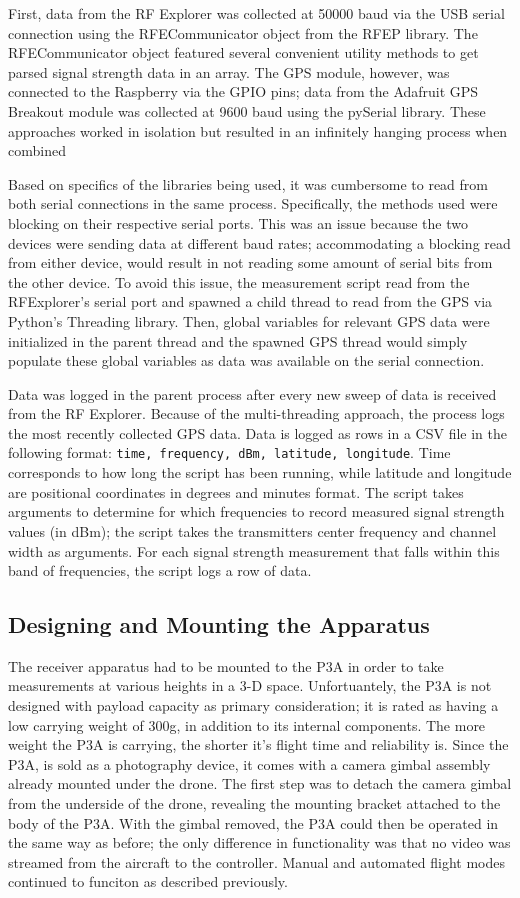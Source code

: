 \documentclass[pageno]{jpaper}
\begin{document}
First, data from the RF Explorer was collected at 50000 baud via the USB serial connection using the RFECommunicator object from the RFEP library. The RFECommunicator object featured several convenient utility methods to get parsed signal strength data in an array. The GPS module, however, was connected to the Raspberry via the GPIO pins; data from the Adafruit GPS Breakout module was collected at 9600 baud using the pySerial library. These approaches worked in isolation but resulted in an infinitely hanging process when combined

Based on specifics of the libraries being used, it was cumbersome to read from both serial connections in the same process. Specifically, the methods used were blocking on their respective serial ports. This was an issue because the two devices were sending data at different baud rates; accommodating a blocking read from either device, would result in not reading some amount of serial bits from the other device. To avoid this issue, the measurement script read from the RFExplorer's serial port and spawned a child thread to read from the GPS via Python's Threading library. Then, global variables for relevant GPS data were initialized in the parent thread and the spawned GPS thread would simply populate these global variables as data was available on the serial connection.

Data was logged in the parent process after every new sweep of data is received from the RF Explorer. Because of the multi-threading approach, the process logs the most recently collected GPS data. Data is logged as rows in a CSV file in the following format: \texttt{time, frequency, dBm, latitude, longitude}. Time corresponds to how long the script has been running, while latitude and longitude are positional coordinates in degrees and minutes format. The script takes arguments to determine for which frequencies to record measured signal strength values (in dBm); the script takes the transmitters center frequency and channel width as arguments. For each signal strength measurement that falls within this band of frequencies, the script logs a row of data.  

\subsection{Designing and Mounting the Apparatus}
The receiver apparatus had to be mounted to the P3A in order to take measurements at various heights in a 3-D space. Unfortuantely, the P3A is not designed with payload capacity as primary consideration; it is rated as having a low carrying weight of 300g, in addition to its internal components. The more weight the P3A is carrying, the shorter it's flight time and reliability is. Since the P3A, is sold as a photography device, it comes with a camera gimbal assembly already mounted under the drone. The first step was to detach the camera gimbal from the underside of the drone, revealing the mounting bracket attached to the body of the P3A. With the gimbal removed, the P3A could then be operated in the same way as before; the only difference in functionality was that no video was streamed from the aircraft to the controller. Manual and automated flight modes continued to funciton as described previously. 
\end{document}
